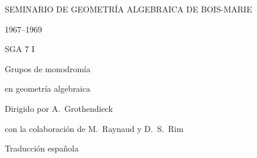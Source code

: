 
\providecommand{\SGASevenSourceGapES}[1]{\textit{[laguna visual: #1]}}
\providecommand{\SGASevenSourceObstructionES}[1]{\textit{[oculto por #1]}}

\thispagestyle{empty}
\begin{center}
\vspace*{2.5cm}
{\large SEMINARIO DE GEOMETRÍA ALGEBRAICA DE BOIS-MARIE\par}
\medskip
{\large 1967--1969\par}
\vspace{2.2cm}
{\Huge SGA 7 I\par}
\vspace{1.2cm}
{\LARGE Grupos de monodromía\par}
\smallskip
{\LARGE en geometría algebraica\par}
\vspace{2.2cm}
{\large Dirigido por A.~Grothendieck\par}
\medskip
{con la colaboración de M.~Raynaud y D.~S.~Rim\par}
\vspace{3.5cm}
{\large Traducción española\par}
\medskip
{\par}
\end{center}
\clearpage

